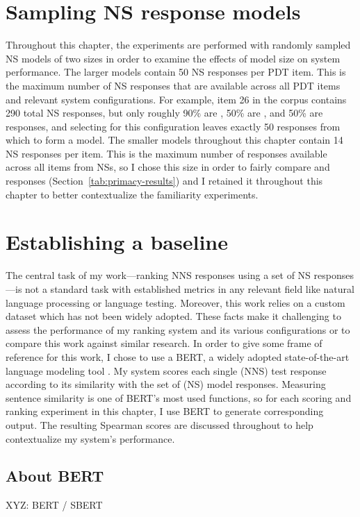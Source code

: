 \section{Sampling NS response models}
\label{sec:sampling}

Throughout this chapter, the experiments are performed with randomly sampled NS models of two sizes in order to examine the effects of model size on system performance. The larger models contain 50 NS responses per PDT item. This is the maximum number of NS responses that are available across all PDT items and relevant system configurations. For example, item 26 in the corpus contains 290 total NS responses, but only roughly 90\% are , 50\% are , and 50\% are  responses, and selecting for this configuration leaves exactly 50 responses from which to form a model. The smaller models throughout this chapter contain 14 NS responses per item. This is the maximum number of responses available across all items from  NSs, so I chose this size in order to fairly compare  and  responses (Section~\ref{tab:primacy-results}) and I retained it throughout this chapter to better contextualize the familiarity experiments.

\section{Establishing a baseline}
\label{sec:bert-baseline}
The central task of my work---ranking NNS responses using a set of NS responses---is not a standard task with established metrics in any relevant field like natural language processing or language testing. Moreover, this work relies on a custom dataset which has not been widely adopted. These facts make it challenging to assess the performance of my ranking system and its various configurations or to compare this work against similar research. In order to give some frame of reference for this work, I chose to use a BERT, a widely adopted state-of-the-art language modeling tool \cite{BertDevlin2018}. My system scores each single (NNS) test response according to its similarity with the set of (NS) model responses. Measuring sentence similarity is one of BERT's most used functions, so for each scoring and ranking experiment in this chapter, I use BERT to generate corresponding output. The resulting Spearman scores are discussed throughout to help contextualize my system's performance.
\subsection{About BERT}
\label{sec:about-bert}
XYZ: BERT / SBERT

